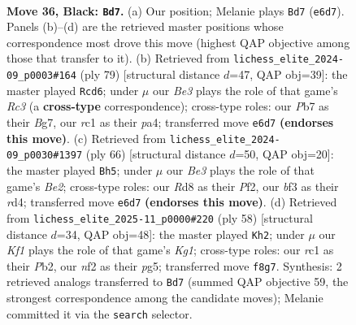 \documentclass[11pt]{article}
\begin{document}
\clearpage

\begin{figure}[p]\centering
\begin{subfigure}{0.46\textwidth}\centering
\resizebox{\linewidth}{!}{%
\newchessgame
\chessboard[
  setfen={3r1k2/1p3p1p/4b3/p2p2r1/8/1P1K1BP1/P4N1P/2R3R1 b - - 0 36},
  showmover=false,
  pgfstyle=straightmove, color=movearrow, markmove={e6-d7}
]}
\caption{}
\end{subfigure}\hfill
\begin{subfigure}{0.46\textwidth}\centering
\resizebox{\linewidth}{!}{%
\newchessgame
\chessboard[
  setfen={8/3r1kb1/1pr3p1/4pp2/P7/3PB1P1/5P2/3RR1K1 b - - 1 40},
  showmover=false,
  pgfstyle=straightmove, color=movearrow, markmove={c6-d6}
]}
\caption{}
\end{subfigure}
\\[4pt]
\begin{subfigure}{0.46\textwidth}\centering
\resizebox{\linewidth}{!}{%
\newchessgame
\chessboard[
  setfen={3r2k1/2p3p1/1p6/4Pp2/p1Pr4/P7/1P2BP2/1K4R1 w - - 0 34},
  showmover=false,
  pgfstyle=straightmove, color=movearrow, markmove={e2-h5}
]}
\caption{}
\end{subfigure}\hfill
\begin{subfigure}{0.46\textwidth}\centering
\resizebox{\linewidth}{!}{%
\newchessgame
\chessboard[
  setfen={4r3/5k2/bp5p/p2r1pp1/8/2B4P/PPP2RP1/2R3K1 w - - 1 30},
  showmover=false,
  pgfstyle=straightmove, color=movearrow, markmove={g1-h2}
]}
\caption{}
\end{subfigure}
\caption{\textbf{Move 36, Black: \texttt{Bd7}.} (a) Our position; Melanie plays \texttt{Bd7} (\texttt{e6d7}). Panels (b)--(d) are the retrieved master positions whose correspondence most drove this move (highest QAP objective among those that transfer to it). (b) Retrieved from \texttt{lichess\_elite\_2024-09\_p0003\#164} (ply 79) [structural distance $d$=47, QAP obj=39]: the master played \texttt{Rcd6}; under $\mu$ our \emph{Be3} plays the role of that game's \emph{Rc3} (a \textbf{cross-type} correspondence); cross-type roles: our \emph{P}b7 as their \emph{B}g7, our \emph{r}c1 as their \emph{p}a4; transferred move \texttt{e6d7} \textbf{(endorses this move)}. (c) Retrieved from \texttt{lichess\_elite\_2024-09\_p0030\#1397} (ply 66) [structural distance $d$=50, QAP obj=20]: the master played \texttt{Bh5}; under $\mu$ our \emph{Be3} plays the role of that game's \emph{Be2}; cross-type roles: our \emph{R}d8 as their \emph{P}f2, our \emph{b}f3 as their \emph{r}d4; transferred move \texttt{e6d7} \textbf{(endorses this move)}. (d) Retrieved from \texttt{lichess\_elite\_2025-11\_p0000\#220} (ply 58) [structural distance $d$=34, QAP obj=48]: the master played \texttt{Kh2}; under $\mu$ our \emph{Kf1} plays the role of that game's \emph{Kg1}; cross-type roles: our \emph{r}c1 as their \emph{P}b2, our \emph{n}f2 as their \emph{p}g5; transferred move \texttt{f8g7}. Synthesis: 2 retrieved analogs transferred to \texttt{Bd7} (summed QAP objective 59, the strongest correspondence among the candidate moves); Melanie committed it via the \texttt{search} selector.}
\label{fig:thought-m71}
\end{figure}
\end{document}
